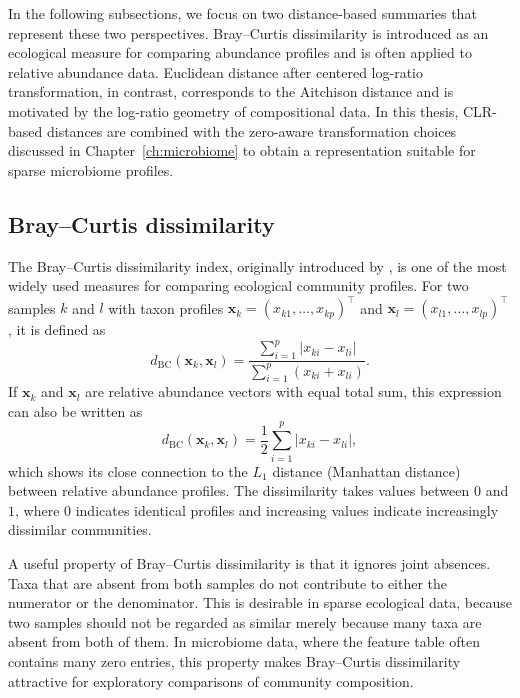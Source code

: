 In the following subsections, we focus on two distance-based summaries that represent these two perspectives. Bray--Curtis dissimilarity is introduced as an ecological measure for comparing abundance profiles and is often applied to relative abundance data. Euclidean distance after centered log-ratio transformation, in contrast, corresponds to the Aitchison distance and is motivated by the log-ratio geometry of compositional data. In this thesis, CLR-based distances are combined with the zero-aware transformation choices discussed in Chapter~\ref{ch:microbiome} to obtain a representation suitable for sparse microbiome profiles.


\subsection{Bray--Curtis dissimilarity}
\label{sec:3community:between:bray-curtis}

The Bray--Curtis dissimilarity index, originally introduced by \citet{bray1957ordination}, is one of the most widely used measures for comparing ecological community profiles. For two samples $k$ and $l$ with taxon profiles $\mathbf{x}_k=(x_{k1},\ldots,x_{kp})^\top$ and $\mathbf{x}_l=(x_{l1},\ldots,x_{lp})^\top$, it is defined as
\begin{equation}
d_{\mathrm{BC}}(\mathbf{x}_k,\mathbf{x}_l)=\frac{\sum_{i=1}^p |x_{ki}-x_{li}|}{\sum_{i=1}^p (x_{ki}+x_{li})}.
\end{equation}
If $\mathbf{x}_k$ and $\mathbf{x}_l$ are relative abundance vectors with equal total sum, this expression can also be written as
\begin{equation}
d_{\mathrm{BC}}(\mathbf{x}_k,\mathbf{x}_l)=\frac{1}{2}\sum_{i=1}^p |x_{ki}-x_{li}|,
\end{equation}
which shows its close connection to the $L_1$ distance (Manhattan distance) between relative abundance profiles. The dissimilarity takes values between $0$ and $1$, where $0$ indicates identical profiles and increasing values indicate increasingly dissimilar communities.

A useful property of Bray--Curtis dissimilarity is that it ignores joint absences. Taxa that are absent from both samples do not contribute to either the numerator or the denominator. This is desirable in sparse ecological data, because two samples should not be regarded as similar merely because many taxa are absent from both of them. In microbiome data, where the feature table often contains many zero entries, this property makes Bray--Curtis dissimilarity attractive for exploratory comparisons of community composition.

